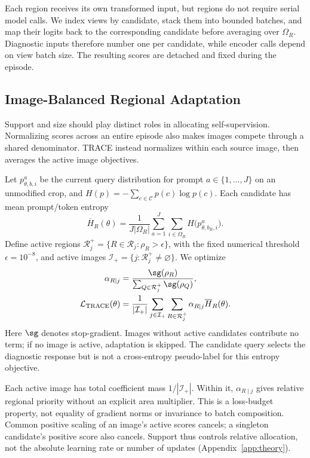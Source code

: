 \documentclass[letterpaper]{article}
\begin{document}
Each region receives its own transformed input, but regions do not require serial model calls. We index views by candidate, stack them into bounded batches, and map their logits back to the corresponding candidate before averaging over $\Omega_R$. Diagnostic inputs therefore number one per candidate, while encoder calls depend on view batch size. The resulting scores are detached and fixed during the episode.

\subsection{Image-Balanced Regional Adaptation}
Support and size should play distinct roles in allocating self-supervision. Normalizing scores across an entire episode also makes images compete through a shared denominator. TRACE instead normalizes within each source image, then averages the active image objectives.

Let $p^a_{\theta,b,i}$ be the current query distribution for prompt $a\in\{1,\ldots,J\}$ on an unmodified crop, and $H(p)=-\sum_{c\in\mathcal C}p(c)\log p(c)$. Each candidate has mean prompt/token entropy
\begin{equation}
\overline H_R(\theta)=\frac{1}{J|\Omega_R|}
\sum_{a=1}^{J}\sum_{i\in\Omega_R}H\bigl(p^a_{\theta,b_R,i}\bigr).
\end{equation}
Define active regions $\mathcal R_j^+=\{R\in\mathcal R_j:\rho_R>\epsilon\}$, with the fixed numerical threshold $\epsilon=10^{-8}$, and active images $\mathcal I_+=\{j:\mathcal R_j^+\neq\varnothing\}$. We optimize
\begin{align}
\alpha_{R\mid j}&=\frac{\sg(\rho_R)}
{\sum_{Q\in\mathcal R_j^+}\sg(\rho_Q)},\\
\mathcal L_{\mathrm{TRACE}}(\theta)&=\frac{1}{|\mathcal I_+|}\sum_{j\in\mathcal I_+}
\sum_{R\in\mathcal R_j^+}\alpha_{R\mid j}\overline H_R(\theta).
\label{eq:loss}
\end{align}
Here $\sg$ denotes stop-gradient. Images without active candidates contribute no term; if no image is active, adaptation is skipped. The candidate query selects the diagnostic response but is not a cross-entropy pseudo-label for this entropy objective.

Each active image has total coefficient mass $1/|\mathcal I_+|$. Within it, $\alpha_{R\mid j}$ gives relative regional priority without an explicit area multiplier. This is a loss-budget property, not equality of gradient norms or invariance to batch composition. Common positive scaling of an image's active scores cancels; a singleton candidate's positive score also cancels. Support thus controls relative allocation, not the absolute learning rate or number of updates (Appendix~\ref{app:theory}).
\end{document}
